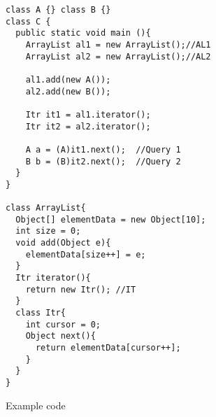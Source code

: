 \begin{figure}
\begin{subfigure}[b]{.9\columnwidth}
\begin{multicols}{2}
\centering
\begin{lstlisting}
class A {} class B {}
class C {
  public static void main (){
    ArrayList al1 = new ArrayList();//AL1
    ArrayList al2 = new ArrayList();//AL2

    al1.add(new A());
    al2.add(new B());

    Itr it1 = al1.iterator();
    Itr it2 = al2.iterator();

    A a = (A)it1.next();  //Query 1
    B b = (B)it2.next();  //Query 2
  }
}

class ArrayList{
  Object[] elementData = new Object[10];
  int size = 0;
  void add(Object e){
    elementData[size++] = e;
  }
  Itr iterator(){
    return new Itr(); //IT
  }
  class Itr{
    int cursor = 0;
    Object next(){
      return elementData[cursor++];
    }
  }
}
\end{lstlisting}
\end{multicols}
\caption{Example code}
\label{fig:obj:code}
\end{subfigure}
\begin{multicols}{2}
\begin{subfigure}[b]{.9\columnwidth}
\begin{center}
\end{center}
\end{subfigure}
\end{multicols}
\end{figure}

